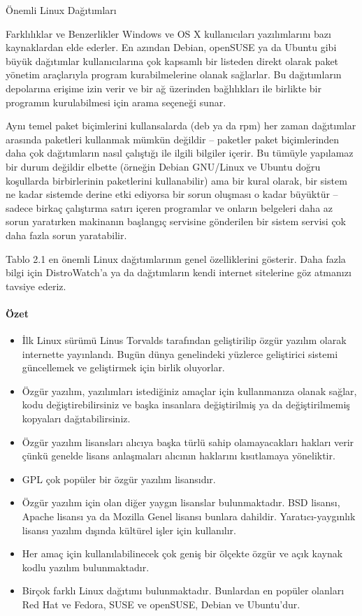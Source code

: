 \documentclass[10pt,a5paper]{book}
\begin{document}
\begin{section}{Önemli Linux Dağıtımları}
\begin{subsection}{Farklılıklar ve Benzerlikler}
Windows ve OS X kullanıcıları yazılımlarını bazı kaynaklardan elde ederler. En azından Debian, openSUSE ya da Ubuntu gibi büyük dağıtımlar kullanıcılarına çok kapsamlı bir listeden direkt olarak paket yönetim araçlarıyla program kurabilmelerine olanak sağlarlar. Bu dağıtımların depolarına erişime izin verir ve bir ağ üzerinden bağlılıkları ile birlikte bir programın kurulabilmesi için arama seçeneği sunar.

Aynı temel paket biçimlerini kullansalarda (deb ya da rpm) her zaman dağıtımlar arasında paketleri kullanmak mümkün değildir – paketler paket biçimlerinden daha çok dağıtımların nasıl çalıştığı ile ilgili bilgiler içerir. Bu tümüyle yapılamaz bir durum değildir elbette (örneğin Debian GNU/Linux ve Ubuntu doğru koşullarda birbirlerinin paketlerini kullanabilir) ama bir kural olarak, bir sistem ne kadar sistemde derine etki ediyorsa bir sorun oluşması o kadar büyüktür – sadece birkaç çalıştırma satırı içeren programlar ve onların belgeleri daha az sorun yaratırken makinanın başlangıç servisine gönderilen bir sistem servisi çok daha fazla sorun yaratabilir.

Tablo 2.1 en önemli Linux dağıtımlarının genel özelliklerini gösterir. Daha fazla bilgi için DistroWatch'a ya da dağıtımların kendi internet sitelerine göz atmanızı tavsiye ederiz.
\paragraph{Özet}{
\begin{itemize}
 \item İlk Linux sürümü Linus Torvalds tarafından geliştirilip özgür yazılım olarak internette yayınlandı. Bugün dünya genelindeki yüzlerce geliştirici sistemi güncellemek ve geliştirmek için birlik oluyorlar.
 \item Özgür yazılım, yazılımları istediğiniz amaçlar için kullanmanıza olanak sağlar, kodu değiştirebilirsiniz ve başka insanlara değiştirilmiş ya da değiştirilmemiş kopyaları dağıtabilirsiniz.
 \item Özgür yazılım lisansları alıcıya başka türlü sahip olamayacakları hakları verir çünkü genelde lisans anlaşmaları alıcının haklarını kısıtlamaya yöneliktir.
 \item GPL çok popüler bir özgür yazılım lisansıdır.
 \item Özgür yazılım için olan diğer yaygın lisanslar bulunmaktadır. BSD lisansı, Apache lisansı ya da Mozilla Genel lisansı bunlara dahildir. Yaratıcı-yaygınlık lisansı yazılım dışında kültürel işler için kullanılır.
 \item Her amaç için kullanılabilinecek çok geniş bir ölçekte özgür ve açık kaynak kodlu yazılım bulunmaktadır.
 \item Birçok farklı Linux dağıtımı bulunmaktadır. Bunlardan en popüler olanları Red Hat ve Fedora, SUSE ve openSUSE, Debian ve Ubuntu'dur.
\end{itemize}}
\end{subsection}
\end{section}
\end{document}

